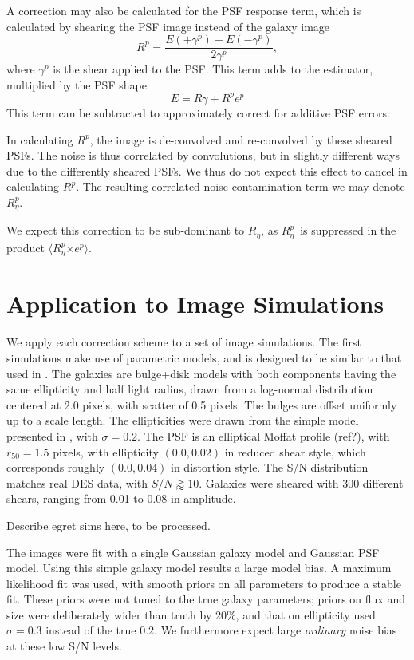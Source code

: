 \documentclass[usegraphicx,usenatbib]{mn2e}
\newcommand{\mcalR}{$R$}
\newcommand{\mcalRpsf}{$R^{p}$}
\newcommand{\mcalRpsfnoise}{$R^{p}_\eta$}
\newcommand{\mcalRnoise}{$R_\eta$}
\begin{document}
A correction may also be calculated for the PSF response term, which is
calculated by shearing the PSF image instead of the galaxy image \citep{HuffMcal}
\begin{equation}
    \mbox{\mcalRpsf} = \frac{E(+\gamma^{p}) - E(-\gamma^{p})}{2 \gamma^{p}},
\end{equation}
where $\gamma^{p}$ is the shear applied to the PSF.  This
term adds to the estimator, multiplied by the PSF shape
\begin{equation}
    E = \mbox{\mcalR} \gamma + \mbox{\mcalRpsf} e^{p} 
\end{equation}
This term can be subtracted to approximately correct for additive PSF errors.

In calculating \mcalRpsf, the image is de-convolved and re-convolved by these
sheared PSFs. The noise is thus correlated by convolutions, but in slightly
different ways due to the differently sheared PSFs.  We thus do not expect this
effect to cancel in calculating \mcalRpsf. The resulting correlated noise
contamination term we may denote \mcalRpsfnoise.

We expect this correction to be sub-dominant to \mcalRnoise, as \mcalRpsfnoise\
is suppressed in the product $\langle$\mcalRpsfnoise$ \times e^{p}\rangle$.

\section{Application to Image Simulations}

We apply each correction scheme to a set of image simulations.  The first
simulations make use of parametric models, and is designed to be similar to
that used in \citet{bfd2015}.  The galaxies are bulge+disk models with both
components having the same ellipticity and half light radius, drawn from a
log-normal distribution centered at 2.0 pixels, with scatter of 0.5 pixels.
The bulges are offset uniformly up to a scale length.  The ellipticities were
drawn from the simple model presented in \cite{ba14}, with $\sigma=0.2$.  The
PSF is an elliptical Moffat profile (ref?), with $r_{50} = 1.5$ pixels, with
ellipticity $(0.0,0.02)$ in reduced shear style, which corresponds roughly
$(0.0, 0.04)$ in distortion style.  The S/N distribution matches real DES data,
with $S/N \gtrapprox 10$.  Galaxies were sheared with 300 different shears,
ranging from 0.01 to 0.08 in amplitude.

Describe egret sims here, to be processed.

The images were fit with a single Gaussian galaxy model and Gaussian PSF model.
Using this simple galaxy model results a large model bias. A maximum likelihood
fit was used, with smooth priors on all parameters to produce a stable fit.
These priors were not tuned to the true galaxy parameters; priors on flux and
size were deliberately wider than truth by 20\%, and that on ellipticity used
$\sigma=0.3$ instead of the true $0.2$.  We furthermore expect large {\em
ordinary} noise bias at these low S/N levels.
\end{document}
